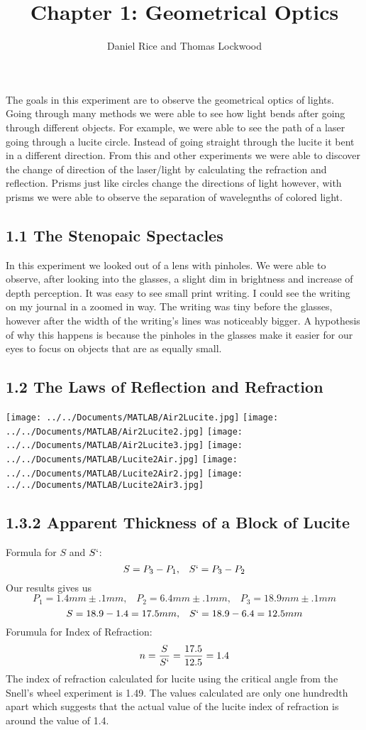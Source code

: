 \documentclass[12pt, oneside]{article}   	%
\title{Chapter 1: Geometrical Optics}
\author{Daniel Rice and Thomas Lockwood}
\date{}							%
\begin{document}
\maketitle{}
\abstract
The goals in this experiment are to observe the geometrical optics of lights.
Going through many methods we were able to see how light bends after going through different objects.
For example, we were able to see the path of a laser going through a lucite circle.
Instead of going straight through the lucite it bent in a different direction.
From this and other experiments we were able to discover the change of direction of the laser/light by calculating the refraction and reflection.
Prisms just like circles change the directions of light however, with prisms we were able to observe the separation of wavelegnths of colored light.

\subsection*{1.1 The Stenopaic Spectacles}
In this experiment we looked out of a lens with pinholes. 
We were able to observe, after looking into the glasses, a slight dim in brightness and increase of depth perception. 
It was easy to see small print writing. 
I could see the writing on my journal in a zoomed in way. 
The writing was tiny before the glasses, however after the width of the writing's lines was noticeably bigger. 
A hypothesis of why this happens is because the pinholes in the glasses make it easier for our eyes to focus on objects that are as equally small.

\subsection*{1.2 The Laws of Reflection and Refraction}
\texttt{[image: ../../Documents/MATLAB/Air2Lucite.jpg]} 
\texttt{[image: ../../Documents/MATLAB/Air2Lucite2.jpg]} 
\texttt{[image: ../../Documents/MATLAB/Air2Lucite3.jpg]} 
\texttt{[image: ../../Documents/MATLAB/Lucite2Air.jpg]} 
\texttt{[image: ../../Documents/MATLAB/Lucite2Air2.jpg]} 
\texttt{[image: ../../Documents/MATLAB/Lucite2Air3.jpg]}
\subsection*{1.3.2 Apparent Thickness of a Block of Lucite}
Formula for $S$ and $S`$:
$$ S = P_3 - P_1, \; \; \; S` = P_3 - P_2$$
Our results gives us
$$ P_1 = 1.4mm \pm.1mm,\; \; \; P_2 = 6.4mm \pm.1mm,\; \; \; P_3 = 18.9mm\pm.1mm $$
$$ S = 18.9 - 1.4 = 17.5mm, \; \; \; S` = 18.9 - 6.4 = 12.5mm $$  
Forumula for Index of Refraction:
$$ n = \frac{S}{S`} = \frac{17.5}{12.5} = 1.4 $$
The index of refraction calculated for lucite using the critical angle from the Snell's wheel experiment is 1.49.
The values calculated are only one hundredth apart which suggests that the actual value of the lucite index of refraction is around the value of 1.4.
\end{document}
